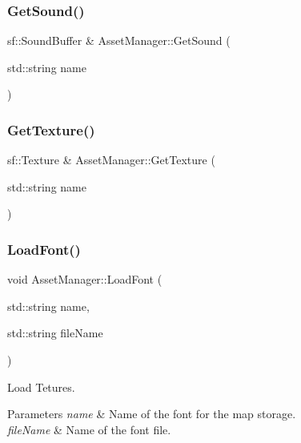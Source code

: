 \mbox{\label{classAssetManager_ad2a21b7f91975c3b74fd4c2c897d4601}} 
\subsubsection{\texorpdfstring{Get\+Sound()}{GetSound()}}
{\footnotesize\ttfamily sf\+::\+Sound\+Buffer \& Asset\+Manager\+::\+Get\+Sound (\begin{DoxyParamCaption}\item[{std\+::string}]{name }\end{DoxyParamCaption})}

\mbox{\label{classAssetManager_aa72940e5dfecd91ff8c5a46ff0b4dfea}} 
\subsubsection{\texorpdfstring{Get\+Texture()}{GetTexture()}}
{\footnotesize\ttfamily sf\+::\+Texture \& Asset\+Manager\+::\+Get\+Texture (\begin{DoxyParamCaption}\item[{std\+::string}]{name }\end{DoxyParamCaption})}

\mbox{\label{classAssetManager_a117f5cea9212e486210fb06dca8aa15a}} 
\subsubsection{\texorpdfstring{Load\+Font()}{LoadFont()}}
{\footnotesize\ttfamily void Asset\+Manager\+::\+Load\+Font (\begin{DoxyParamCaption}\item[{std\+::string}]{name,  }\item[{std\+::string}]{file\+Name }\end{DoxyParamCaption})}



Load Tetures. 


\begin{DoxyParams}{Parameters}
{\em name} & Name of the font for the map storage. \\
\hline
{\em file\+Name} & Name of the font file. \\
\hline
\end{DoxyParams}
\mbox{\label{classAssetManager_a057918a0150c70d7c3c4eb72e7531ec7}} 
